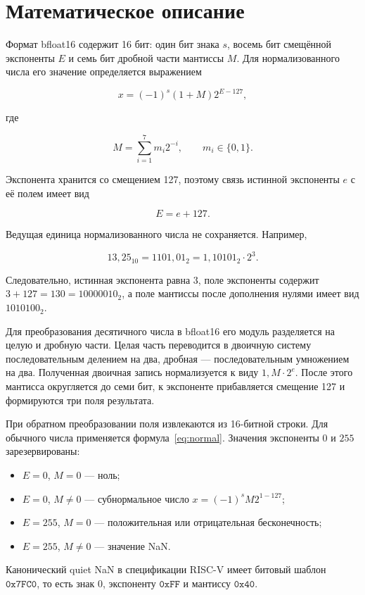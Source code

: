 \section{Математическое описание}

Формат bfloat16 содержит 16 бит: один бит знака $s$, восемь бит смещённой
экспоненты $E$ и семь бит дробной части мантиссы $M$. Для нормализованного числа
его значение определяется выражением

\begin{equation}
    x = (-1)^s \left(1 + M\right) 2^{E-127},
    \label{eq:normal}
\end{equation}

где

\begin{equation}
    M = \sum_{i=1}^{7} m_i 2^{-i}, \qquad m_i \in \{0,1\}.
    \label{eq:mantissa}
\end{equation}

Экспонента хранится со смещением 127, поэтому связь истинной экспоненты $e$
с её полем имеет вид

\begin{equation}
    E = e + 127.
\end{equation}

Ведущая единица нормализованного числа не сохраняется. Например,

\[
    13{,}25_{10} = 1101{,}01_2
    = 1{,}10101_2 \cdot 2^3.
\]

Следовательно, истинная экспонента равна $3$, поле экспоненты содержит
$3+127=130=10000010_2$, а поле мантиссы после дополнения нулями имеет вид
$1010100_2$.

Для преобразования десятичного числа в bfloat16 его модуль разделяется на целую
и дробную части. Целая часть переводится в двоичную систему последовательным
делением на два, дробная --- последовательным умножением на два. Полученная
двоичная запись нормализуется к виду $1{,}M\cdot 2^e$. После этого мантисса
округляется до семи бит, к экспоненте прибавляется смещение 127 и формируются
три поля результата.

При обратном преобразовании поля извлекаются из 16-битной строки. Для обычного
числа применяется формула~\eqref{eq:normal}. Значения экспоненты $0$ и $255$
зарезервированы:

\begin{itemize}
    \item $E=0$, $M=0$ --- ноль;
    \item $E=0$, $M\ne0$ --- субнормальное число
          $x=(-1)^s M 2^{1-127}$;
    \item $E=255$, $M=0$ --- положительная или отрицательная бесконечность;
    \item $E=255$, $M\ne0$ --- значение NaN.
\end{itemize}

Канонический quiet NaN в спецификации RISC-V имеет битовый шаблон
$\mathtt{0x7FC0}$, то есть знак $0$, экспоненту $\mathtt{0xFF}$ и мантиссу
$\mathtt{0x40}$.

\newpage
